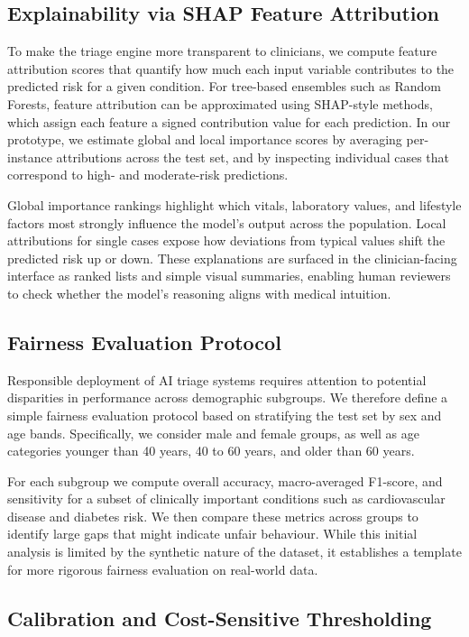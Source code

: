 \documentclass[conference]{IEEEtran}
\begin{document}
\subsection{Explainability via SHAP Feature Attribution}

To make the triage engine more transparent to clinicians, we compute feature attribution scores that quantify how much each input variable contributes to the predicted risk for a given condition. For tree-based ensembles such as Random Forests, feature attribution can be approximated using SHAP-style methods, which assign each feature a signed contribution value for each prediction. In our prototype, we estimate global and local importance scores by averaging per-instance attributions across the test set, and by inspecting individual cases that correspond to high- and moderate-risk predictions.

Global importance rankings highlight which vitals, laboratory values, and lifestyle factors most strongly influence the model's output across the population. Local attributions for single cases expose how deviations from typical values shift the predicted risk up or down. These explanations are surfaced in the clinician-facing interface as ranked lists and simple visual summaries, enabling human reviewers to check whether the model's reasoning aligns with medical intuition.

\subsection{Fairness Evaluation Protocol}

Responsible deployment of AI triage systems requires attention to potential disparities in performance across demographic subgroups. We therefore define a simple fairness evaluation protocol based on stratifying the test set by sex and age bands. Specifically, we consider male and female groups, as well as age categories younger than 40 years, 40 to 60 years, and older than 60 years.

For each subgroup we compute overall accuracy, macro-averaged F1-score, and sensitivity for a subset of clinically important conditions such as cardiovascular disease and diabetes risk. We then compare these metrics across groups to identify large gaps that might indicate unfair behaviour. While this initial analysis is limited by the synthetic nature of the dataset, it establishes a template for more rigorous fairness evaluation on real-world data.

\subsection{Calibration and Cost-Sensitive Thresholding}
\end{document}
